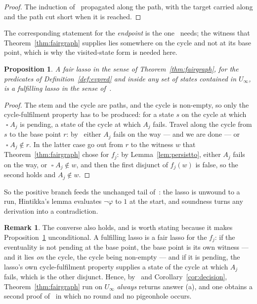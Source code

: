 \documentclass[11pt,a4paper]{article}
\newtheorem{proposition}[theorem]{Proposition}
\theoremstyle{definition}
\newtheorem{remark}[theorem]{Remark}
\newcommand{\Always}{\mathop{\square}}
\begin{document}
\begin{proof}
The induction of~\cite[Lem.~2.8]{m4} propagated along the path, with the target
carried along and the path cut short when it is reached.
\end{proof}

The corresponding statement for the \emph{endpoint} is the one~\cite{m4} needs;
the witness that Theorem~\ref{thm:fairgraph} supplies lies somewhere on the
cycle and not at its base point, which is why the visited-state form is needed
here.

\begin{proposition}\label{prop:lasso5.3}
A fair lasso in the sense of Theorem~\ref{thm:fairgraph}, for the predicates of
Definition~\ref{def:evpred} and inside any set of states contained in
$U_\infty$, is a fulfilling lasso in the sense of~\cite[Prop.~5.3]{m4}.
\end{proposition}

\begin{proof}
The stem and the cycle are paths, and the cycle is non-empty, so only the
cycle-fulfilment property has to be produced: for a state $s$ on the cycle at
which $\Always A_j$ is pending, a state of the cycle at which $A_j$ fails.
Travel along the cycle from $s$ to the base point $r$: by~\cite[Lem.~2.8]{m4}
either $A_j$ fails on the way --- and we are done --- or $\Always A_j\notin r$.
In the latter case go out from $r$ to the witness $w$ that
Theorem~\ref{thm:fairgraph} chose for $f_j$: by Lemma~\ref{lem:persistto},
either $A_j$ fails on the way, or $\Always A_j\notin w$, and then the first
disjunct of $f_j(w)$ is false, so the second holds and $A_j\notin w$.
\end{proof}

So the positive branch feeds the unchanged tail of~\cite{m4}: the lasso is
unwound to a run, Hintikka's lemma evaluates $\neg\varphi$ to $1$ at the start,
and soundness turns any derivation into a contradiction.

\begin{remark}\label{rem:converse}
The converse also holds, and is worth stating because it makes
Proposition~\ref{prop:lasso5.3} unconditional.  A fulfilling lasso is a fair
lasso for the $f_j$: if the eventuality is not pending at the base point, the
base point is its own witness --- and it lies \emph{on} the cycle, the cycle
being non-empty --- and if it is pending, the lasso's own cycle-fulfilment
property supplies a state of the cycle at which $A_j$ fails, which is the other
disjunct.  Hence, by~\cite[Prop.~5.3]{m4} and Corollary~\ref{cor:decision},
Theorem~\ref{thm:fairgraph} run on $U_\infty$ \emph{always} returns answer (a),
and one obtains a second proof of~\cite[Prop.~5.3]{m4} in which no round and no
pigeonhole occurs.
\end{remark}
\end{document}
